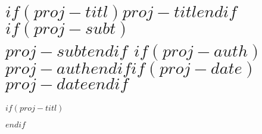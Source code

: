
\part*{$if(proj-titl)$$proj-titl$$endif$$if(proj-subt)$\\ \bigskip\bigskip\bigskip\bigskip\bigskip\normalfont\Large{$proj-subt$}$endif$ $if(proj-auth)$\\ \bigskip\bigskip\bigskip\bigskip\bigskip\normalfont\large{$proj-auth$}$endif$$if(proj-date)$\\ \bigskip\normalfont\large{$proj-date$}$endif$}
$if(proj-titl)$$endif$

\def \logbuchprojectmark {$if(proj-titl)$$proj-titl$$else$$endif$}
